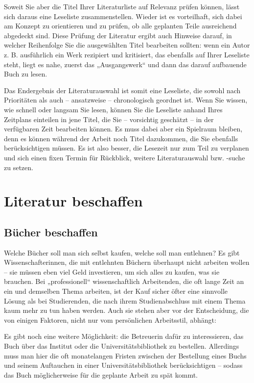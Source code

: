 \documentclass[]{book}
\theoremstyle{definition}
\theoremstyle{definition}
\theoremstyle{definition}
\theoremstyle{remark}
\begin{document}
Soweit Sie aber die Titel Ihrer Literaturliste auf Relevanz prüfen
können, lässt sich daraus eine Leseliste zusammenstellen. Wieder ist es
vorteilhaft, sich dabei am Konzept zu orientieren und zu prüfen, ob alle
geplanten Teile ausreichend abgedeckt sind. Diese Prüfung der Literatur
ergibt auch Hinweise darauf, in welcher Reihenfolge Sie die ausgewählten
Titel bearbeiten sollten: wenn ein Autor z. B. ausführlich ein Werk
rezipiert und kritisiert, das ebenfalls auf Ihrer Leseliste steht, liegt
es nahe, zuerst das „Ausgangswerk`` und dann das darauf aufbauende Buch
zu lesen.

Das Endergebnis der Literaturauswahl ist somit eine Leseliste, die
sowohl nach Prioritäten als auch -- ansatzweise -- chronologisch
geordnet ist. Wenn Sie wissen, wie schnell oder langsam Sie lesen,
können Sie die Leseliste anhand Ihres Zeitplans einteilen in jene Titel,
die Sie -- vorsichtig geschätzt -- in der verfügbaren Zeit bearbeiten
können. Es muss dabei aber ein Spielraum bleiben, denn es können während
der Arbeit noch Titel dazukommen, die Sie ebenfalls berücksichtigen
müssen. Es ist also besser, die Lesezeit nur zum Teil zu verplanen und
sich einen fixen Termin für Rückblick, weitere Literaturauswahl bzw.
-suche zu setzen.

\hypertarget{literatur-beschaffen}{\section{Literatur
beschaffen}\label{literatur-beschaffen}}

\subsection{Bücher beschaffen}\label{bucher-beschaffen}

Welche Bücher soll man sich selbst kaufen, welche soll man entlehnen? Es
gibt Wissenschafterinnen, die mit entlehnten Büchern überhaupt nicht
arbeiten wollen -- sie müssen eben viel Geld investieren, um sich alles
zu kaufen, was sie brauchen. Bei „professionell`` wissenschaftlich
Arbeitenden, die oft lange Zeit an ein und demselben Thema arbeiten, ist
der Kauf sicher öfter eine sinnvolle Lösung als bei Studierenden, die
nach ihrem Studienabschluss mit einem Thema kaum mehr zu tun haben
werden. Auch sie stehen aber vor der Entscheidung, die von einigen
Faktoren, nicht nur vom persönlichen Arbeitsstil, abhängt:

Es gibt noch eine weitere Möglichkeit: die Betreuerin dafür zu
interessieren, das Buch über das Institut oder die
Universitätsbibliothek zu bestellen. Allerdings muss man hier die oft
monatelangen Fristen zwischen der Bestellung eines Buchs und seinem
Auftauchen in einer Universitätsbibliothek berücksichtigen -- sodass das
Buch möglicherweise für die geplante Arbeit zu spät kommt.
\end{document}
